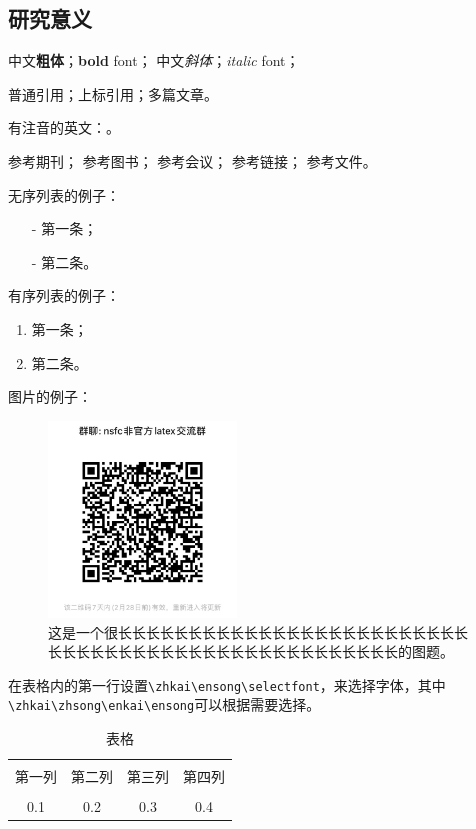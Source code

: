 
\subsection{研究意义}
\vspace{-5pt}

中文\textbf{粗体}；\textbf{bold} font；
中文\textit{斜体}；\textit{italic} font；

普通引用\cite{test}；上标引用；多篇文章。

有注音的英文：\cite{test}。

参考期刊\cite{test}；
参考图书\cite{test2}；
参考会议\cite{test5}；
参考链接\cite{test4}；
参考文件\cite{test6}。

无序列表的例子：
\begin{itemize}
	\item[-] 第一条；
	\item[-] 第二条。
\end{itemize}

有序列表的例子：
\begin{enumerate}
	\item 第一条；
	\item 第二条。
\end{enumerate}

图片的例子：
\begin{figure}[h]
\centering %
\includegraphics[width=5cm]{figures/wechatgroup}
\captionsetup{justification=centering} %
\caption{这是一个很长长长长长长长长长长长长长长长长长长长长长长长长长长长长长长长长长长长长长长长长长长长长长长长长长长的图题。}
\end{figure}


在表格内的第一行设置\verb|\zhkai\ensong\selectfont|，来选择字体，其中\verb|\zhkai\zhsong\enkai\ensong|可以根据需要选择。
\begin{table}[htbp]
	\zhkai\ensong\selectfont%
	\centering  %
	\caption{表格}  %
	\label{table1}  %
	\begin{tabular}{|c|c|c|c|}  
		\hline  %
		& & & \\[-6pt]  %
		第一列&第二列&第三列&第四列 \\  %
		\hline
		& & & \\[-6pt]  %
		0.1&0.2&0.3&0.4 \\
		\hline
	\end{tabular}
\end{table}

